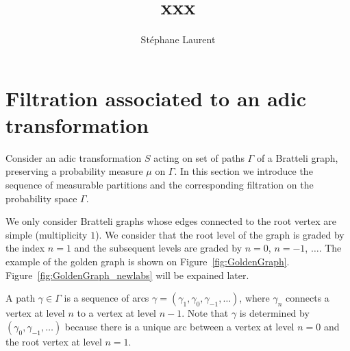 \documentclass[12pt,a4paper]{article}
\author{Stéphane Laurent}
\title{xxx}
\begin{document}
\theoremstyle{defstyle}
\newtheorem{definition}{Definition}
\newtheorem{remark}{Remark}
\newtheorem{question}{Question}
\newtheorem{clarify}{To clarify}
\theoremstyle{thmstyle}
\newtheorem{thm}{Theorem}[section]
\newtheorem{ppsition}{Proposition}
\newtheorem{lemma}{Lemma}

\newcommand{\FF}{\mathcal{F}}
\newcommand{\GG}{\mathcal{G}}
\newcommand{\EE}{\mathbb{E}}
\newcommand{\II}{\mathcal{I}}
\newcommand{\LL}{\mathcal{L}}
\newcommand{\OO}{\mathcal{O}}
\newcommand{\XX}{\mathcal{X}}
\newcommand{\given}{\mid}
\newcommand{\eps}{\epsilon}
\newcommand{\indic}{\boldsymbol 1}
\newcommand{\Vb}{\boldsymbol V}

\newcommand{\indvee}{\dot{\vee}}
\newcommand{\indep}{\mathrel{\text{\scalebox{1.07}{$\perp\mkern-10mu\perp$}}}}

\maketitle

\section{Filtration associated to an adic transformation} 

Consider an adic transformation $S$ acting on set of paths $\Gamma$ of a 
Bratteli graph, preserving a probability measure $\mu$ on $\Gamma$. 
In this section we introduce the sequence of measurable partitions 
and the corresponding filtration on the probability space $\Gamma$.

We only consider Bratteli graphs whose edges connected to the root 
vertex are simple (multiplicity $1$). 
We consider that the root level of the graph is graded by the index 
$n=1$ and the subsequent levels are graded by $n=0$, $n=-1$, $\ldots$. 
The example of the golden graph is shown on Figure~\ref{fig:GoldenGraph}. 
Figure~\ref{fig:GoldenGraph_newlabs} will be expained later.

A path $\gamma \in \Gamma$ is a sequence of arcs 
$\gamma=(\gamma_{1}, \gamma_0, \gamma_{-1}, \ldots)$, where $\gamma_n$ connects 
a vertex at level $n$ to a vertex at level $n-1$. 
Note that $\gamma$ is determined by $(\gamma_0, \gamma_{-1}, \ldots)$ 
because there is a unique arc between a vertex at level $n=0$ and the root vertex 
at level $n=1$.  
\end{document}
